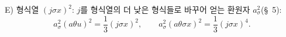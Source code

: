 
E) 형식열 $(j\sigma x)^2$: $j$를 형식열의 더 낮은 형식들로 바꾸어 얻는 환원자 $a_\sigma^2$(\S\ 5):
\[
a_\sigma^2(a\theta u)^2=\frac13(j\sigma x)^2,
\qquad
 a_\sigma^2(a\theta\sigma x)^2=\frac13(j\sigma x)^4.
\]
